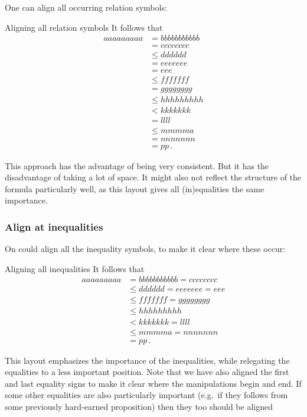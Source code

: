 One can align all occurring relation symbols:
\begin{showlatex}{Aligning all relation symbols}
It follows that
\begin{align*}
  aaaaaaaaa
  &= bbbbbbbbbbb \\
  &= cccccccc \\
  &\leq dddddd \\
  &= eeeeeee \\
  &= eee \\
  &\leq fffffff \\
  &= gggggggg \\
  &\leq hhhhhhhhh \\
  &< kkkkkkk \\
  &= llll \\
  &\leq mmmma \\
  &= nnnnnnn \\
  &= pp \,.
\end{align*}
\end{showlatex}
This approach has the advantage of being very consistent.
But it has the disadvantage of taking a lot of space.
It might also not reflect the structure of the formula particularly well, as this layout gives all (in)equalities the same importance.
    
\subsubsection{Align at inequalities}

On could align all the inequality symbols, to make it clear where these occur:
\begin{showlatex}{Aligning all inequalities}
It follows that
\begin{align*}
  aaaaaaaaa
  &= bbbbbbbbbbb
  = cccccccc
  \\
  &\leq
  dddddd
  = eeeeeee
  = eee
  \\
  &\leq
  fffffff
  = gggggggg
  \\
  &\leq
  hhhhhhhhh
  \\
  &<
  kkkkkkk
  = llll \\
  &\leq mmmma
  = nnnnnnn
  \\
  &= pp \,.
\end{align*}
\end{showlatex}
This layout emphasizes the importance of the inequalities, while relegating the equalities to a less important position.
Note that we have also aligned the first and last equality signs to make it clear where the manipulations begin and end.
If some other equalities are also particularly important (e.g.\ if they follows from some previously hard-earned proposition) then they too should be aligned

